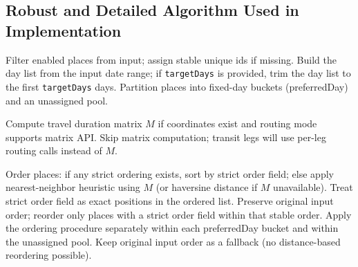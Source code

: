 \begin{appendices}


\section{Robust and Detailed Algorithm Used in Implementation}
\label{app:algorithm}

\vspace{-3mm}

\begin{algorithm}[H]
\caption{Auto-scheduling algorithm: NN ordering with constraint handling}
\begin{algorithmic}[1]
\STATE Filter enabled places from input; assign stable unique ids if missing.
\STATE Build the day list from the input date range; if \texttt{targetDays} is provided, trim the day list to the first \texttt{targetDays} days.
\STATE Partition places into fixed-day buckets (preferredDay) and an unassigned pool.

\STATE Compute travel duration matrix $M$ if coordinates exist and routing mode supports matrix API.
  \STATE Skip matrix computation; transit legs will use per-leg routing calls instead of $M$.
\ENDIF

\STATE Order places: if any strict ordering exists, sort by strict order field; else apply nearest-neighbor heuristic using $M$ (or haversine distance if $M$ unavailable).
  \STATE Treat strict order field as exact positions in the ordered list.
  \STATE Preserve original input order; reorder only places with a strict order field within that stable order.
\ENDIF
\STATE Apply the ordering procedure separately within each preferredDay bucket and within the unassigned pool.
  \STATE Keep original input order as a fallback (no distance-based reordering possible).
\ENDIF


\end{algorithmic}
\end{algorithm}
\end{appendices}
